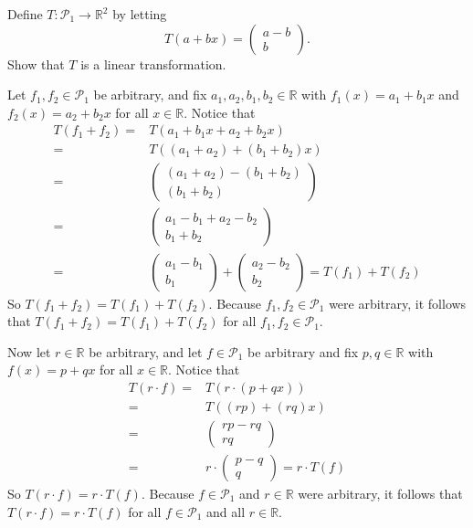 \documentclass[12pt]{article}
\newenvironment{problem}[2][Problem]
{
	\begin{trivlist} 
		\item[\hskip \labelsep {\bfseries #1 #2:}]
	}
{
	\end{trivlist}
	}
\newenvironment{solution}[1][Solution]
{
	\begin{trivlist} 
		\item[\hskip \labelsep {\itshape #1:}]
	}
	{
	\end{trivlist}
}
\begin{document}
\newpage
\begin{problem}{3}
Define $T:\mathcal{P}_1 \to \mathbb{R}^2$ by letting
\[
T(a+bx)=\begin{pmatrix} a-b\\b \end{pmatrix} \text{.}
\]
Show that $T$ is a linear transformation.
\noindent
\newline
\newline
\begin{solution}
Let $f_1, f_2 \in \mathcal{P}_1$ be arbitrary, and fix $a_1,a_2,b_1,b_2 \in \mathbb{R}$ with $f_1 (x) = a_1 + b_1 x$ and $f_2 (x) = a_2 + b_2 x$ for all $x \in \mathbb{R}$. Notice that
\begin{align*}
T(f_1 + f_2) =& T(a_1 + b_1 x + a_2 + b_2 x)\\
=& T((a_1 + a_2) +(b_1+b_2) x) \\
=& \begin{pmatrix} (a_1 + a_2) - (b_1 + b_2)\\ (b_1 + b_2) \end{pmatrix}\\
=& \begin{pmatrix} a_1 - b_1 + a_2 - b_2\\ b_1 + b_2 \end{pmatrix} \\
=&  \begin{pmatrix} a_1 - b_1 \\  b_1 \end{pmatrix} + \begin{pmatrix}  a_2 - b_2\\  b_2 \end{pmatrix} = T(f_1) + T(f_2)
\end{align*}
So $T(f_1 + f_2) = T(f_1) + T(f_2)$. Because $f_1,f_2 \in \mathcal{P}_1$ were arbitrary, it follows that $T(f_1 + f_2) = T(f_1) + T(f_2)$ for all $f_1,f_2 \in \mathcal{P}_1$.

Now let $r \in \mathbb{R}$ be arbitrary, and let $f \in \mathcal{P}_1$ be arbitrary and fix $p,q \in \mathbb{R}$ with $f(x) = p +qx$ for all $x \in \mathbb{R}$. Notice that
\begin{align*}
T(r\cdot f) =& T(r\cdot (p +qx))\\
=& T((rp) + (rq)x) \\
=& \begin{pmatrix}rp -rq \\ rq \end{pmatrix}\\
=& r\cdot \begin{pmatrix} p-q\\ q \end{pmatrix} = r\cdot T(f)
\end{align*}
So $T(r\cdot f) = r\cdot T(f)$. Because $f \in \mathcal{P}_1$ and $r \in \mathbb{R}$ were arbitrary, it follows that $T(r\cdot f) = r\cdot T(f)$ for all $f \in \mathcal{P}_1$ and all $r \in \mathbb{R}$.


\end{solution}
\end{problem}
\end{document}

